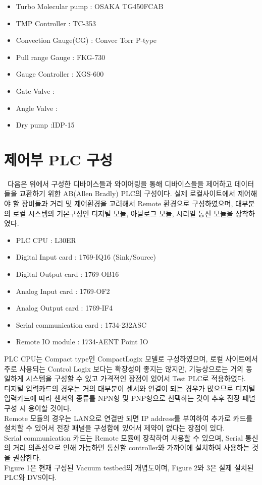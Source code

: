 \documentclass[11pt
  , a4paper
  , article
  , oneside
]{memoir}
\begin{document}
\begin{itemize}
\item Turbo Molecular pump 	: OSAKA TG450FCAB
\item TMP Controller	    : TC-353
\item Convection Gauge(CG)  : Convec Torr P-type
\item Pull range Gauge      : FKG-730
\item Gauge Controller      : XGS-600
\item Gate Valve            : 
\item Angle Valve           : 
\item Dry pump				:IDP-15
\end{itemize}


\section{제어부 PLC 구성}\
다음은 위에서 구성한 디바이스들과 와이어링을 통해 디바이스들을 제어하고 데이터들을 교환하기 위한 AB(Allen Bradly) PLC의 구성이다. 실제 로컬사이트에서 제어해야 할 장비들과 거리 및 제어환경을 고려해서 Remote 환경으로 구성하였으며, 대부분의 로컬 시스템의 기본구성인 디지털 모듈, 아날로그 모듈, 시리얼 통신 모듈을 장착하였다.

\begin{itemize}
\item PLC CPU	 			: L30ER
\item Digital Input card	: 1769-IQ16 (Sink/Source) 
\item Digital Output card	: 1769-OB16 
\item Analog Input card		: 1769-OF2 
\item Analog Output card	: 1769-IF4 
\item Serial communication card	: 1734-232ASC 
\item Remote IO module			: 1734-AENT Point IO 
\end{itemize}

PLC CPU는 Compact type인 CompactLogix 모델로 구성하였으며, 로컬 사이트에서 주로 사용되는 Control Logix 보다는 확장성이 좋지는 않지만, 기능상으로는 거의 동일하게 시스템을 구성할 수 있고 가격적인 장점이 있어서 Test PLC로 적용하였다.\\
디지털 입력카드의 경우는 거의 대부분이 센서와 연결이 되는 경우가 많으므로 디지털 입력카드에 따라 센서의 종류를 NPN형 및 PNP형으로 선택하는 것이 추후 전장 패널구성 시 용이할 것이다.\\
Remote 모듈의 경우는 LAN으로 연결만 되면 IP address를 부여하여 추가로 카드를 설치할 수 있어서 전장 패널을 구성함에 있어서 제약이 없다는 장점이 있다.\\
Serial communication 카드는 Remote 모듈에 장착하여 사용할 수 있으며, Serial 통신의 거리 의존성으로 인해 가능하면 통신할 controller와 가까이에 설치하여 사용하는 것을 권장한다.
\\
\newline
Figure 1은 현재 구성된 Vacuum testbed의 개념도이며, Figure 2와 3은 실제 설치된 PLC와 DVS이다.\\
\end{document}
